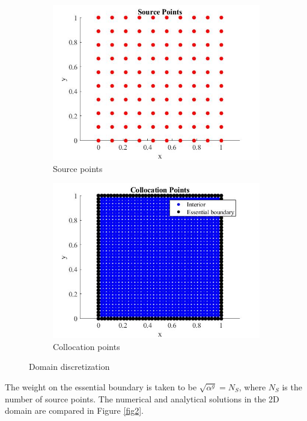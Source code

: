\documentclass[11pt, letterpaper]{article}
\begin{document}
\begin{figure}[H]
\centering
\begin{subfigure}{.5\textwidth}
  \centering
  \includegraphics[width=0.97\linewidth]{images/5.jpg}
  \caption{Source points}
  \label{fig1-1}
\end{subfigure}%
\begin{subfigure}{.5\textwidth}
  \centering
  \includegraphics[width=0.97\linewidth]{images/6.jpg}
  \caption{Collocation points}
  \label{fig1-2}
\end{subfigure}
\caption{Domain discretization}
\label{fig1}
\end{figure}

The weight on the essential boundary is taken to be $\sqrt{\alpha^g}=N_S$, where $N_S$ is the number of source points. The numerical and analytical solutions in the 2D domain are compared in Figure \ref{fig2}.
\end{document}
